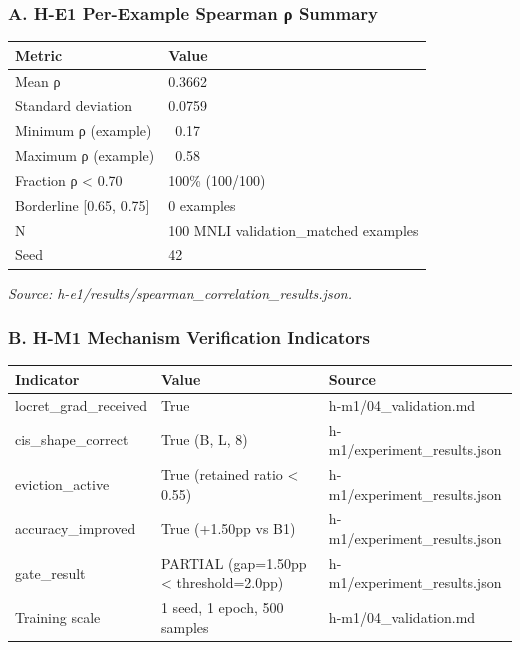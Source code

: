 
\subsubsection{A. H-E1 Per-Example Spearman ρ Summary}

\begin{table}[htbp]
\centering
\begin{tabular}{ll}
\toprule
Metric & Value \\
\midrule
Mean ρ & 0.3662 \\
Standard deviation & 0.0759 \\
Minimum ρ (example) & ~0.17 \\
Maximum ρ (example) & ~0.58 \\
Fraction ρ < 0.70 & 100\% (100/100) \\
Borderline [0.65, 0.75] & 0 examples \\
N & 100 MNLI validation_matched examples \\
Seed & 42 \\
\bottomrule
\end{tabular}
\end{table}

\textit{Source: h-e1/results/spearman_correlation_results.json.}

\subsubsection{B. H-M1 Mechanism Verification Indicators}

\begin{table}[htbp]
\centering
\begin{tabular}{lll}
\toprule
Indicator & Value & Source \\
\midrule
locret_grad_received & True & h-m1/04_validation.md \\
cis_shape_correct & True (B, L, 8) & h-m1/experiment_results.json \\
eviction_active & True (retained ratio < 0.55) & h-m1/experiment_results.json \\
accuracy_improved & True (+1.50pp vs B1) & h-m1/experiment_results.json \\
gate_result & PARTIAL (gap=1.50pp < threshold=2.0pp) & h-m1/experiment_results.json \\
Training scale & 1 seed, 1 epoch, 500 samples & h-m1/04_validation.md \\
\bottomrule
\end{tabular}
\end{table}

